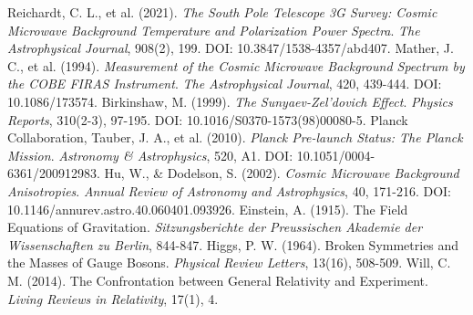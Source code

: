 \documentclass[12pt,a4paper]{article}
\begin{document}
\begin{thebibliography}{99}
		 Reichardt, C. L., et al. (2021). \textit{The South Pole Telescope 3G Survey: Cosmic Microwave Background Temperature and Polarization Power Spectra}. \textit{The Astrophysical Journal}, 908(2), 199. DOI: 10.3847/1538-4357/abd407.
		 Mather, J. C., et al. (1994). \textit{Measurement of the Cosmic Microwave Background Spectrum by the COBE FIRAS Instrument}. \textit{The Astrophysical Journal}, 420, 439-444. DOI: 10.1086/173574.
		 Birkinshaw, M. (1999). \textit{The Sunyaev-Zel'dovich Effect}. \textit{Physics Reports}, 310(2-3), 97-195. DOI: 10.1016/S0370-1573(98)00080-5.
		 Planck Collaboration, Tauber, J. A., et al. (2010). \textit{Planck Pre-launch Status: The Planck Mission}. \textit{Astronomy \& Astrophysics}, 520, A1. DOI: 10.1051/0004-6361/200912983.
		 Hu, W., \& Dodelson, S. (2002). \textit{Cosmic Microwave Background Anisotropies}. \textit{Annual Review of Astronomy and Astrophysics}, 40, 171-216. DOI: 10.1146/annurev.astro.40.060401.093926.
		 Einstein, A. (1915). The Field Equations of Gravitation. \textit{Sitzungsberichte der Preussischen Akademie der Wissenschaften zu Berlin}, 844-847.
		 Higgs, P. W. (1964). Broken Symmetries and the Masses of Gauge Bosons. \textit{Physical Review Letters}, 13(16), 508-509.
		 Will, C. M. (2014). The Confrontation between General Relativity and Experiment. \textit{Living Reviews in Relativity}, 17(1), 4.
	\end{thebibliography}
	
\end{document}
